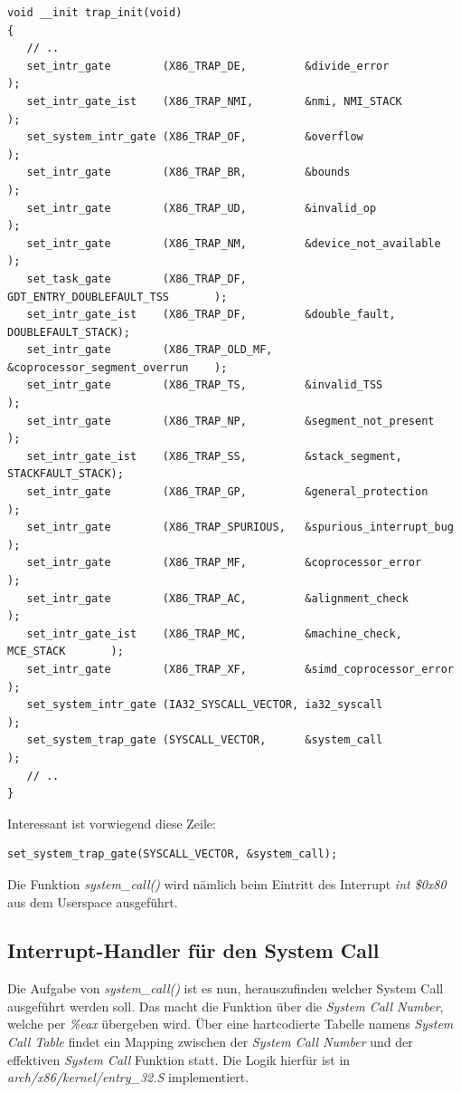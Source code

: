 \begin{lstlisting}[label=idt,caption=arch/x86/kernel/traps.c]
void __init trap_init(void)
{
   // ..
   set_intr_gate        (X86_TRAP_DE,         &divide_error                   );
   set_intr_gate_ist    (X86_TRAP_NMI,        &nmi, NMI_STACK                 );
   set_system_intr_gate (X86_TRAP_OF,         &overflow                       );
   set_intr_gate        (X86_TRAP_BR,         &bounds                         );
   set_intr_gate        (X86_TRAP_UD,         &invalid_op                     );
   set_intr_gate        (X86_TRAP_NM,         &device_not_available           );
   set_task_gate        (X86_TRAP_DF,         GDT_ENTRY_DOUBLEFAULT_TSS       );
   set_intr_gate_ist    (X86_TRAP_DF,         &double_fault, DOUBLEFAULT_STACK);
   set_intr_gate        (X86_TRAP_OLD_MF,     &coprocessor_segment_overrun    );
   set_intr_gate        (X86_TRAP_TS,         &invalid_TSS                    );
   set_intr_gate        (X86_TRAP_NP,         &segment_not_present            );
   set_intr_gate_ist    (X86_TRAP_SS,         &stack_segment, STACKFAULT_STACK);
   set_intr_gate        (X86_TRAP_GP,         &general_protection             );
   set_intr_gate        (X86_TRAP_SPURIOUS,   &spurious_interrupt_bug         );
   set_intr_gate        (X86_TRAP_MF,         &coprocessor_error              );
   set_intr_gate        (X86_TRAP_AC,         &alignment_check                );
   set_intr_gate_ist    (X86_TRAP_MC,         &machine_check, MCE_STACK       );
   set_intr_gate        (X86_TRAP_XF,         &simd_coprocessor_error         );
   set_system_intr_gate (IA32_SYSCALL_VECTOR, ia32_syscall                    );
   set_system_trap_gate (SYSCALL_VECTOR,      &system_call                    );
   // ..
}
\end{lstlisting}

Interessant ist vorwiegend diese Zeile:
\begin{lstlisting}
set_system_trap_gate(SYSCALL_VECTOR, &system_call);
\end{lstlisting}

Die Funktion \emph{system\_call()} wird nämlich beim Eintritt des Interrupt \emph{int \$0x80} aus dem Userspace ausgeführt.


\subsection{Interrupt-Handler für den System Call}

Die Aufgabe von \emph{system\_call()} ist es nun, herauszufinden welcher System Call ausgeführt werden soll. Das macht die Funktion über die \emph{System Call Number}, welche per \emph{\%eax}
übergeben wird. Über eine hartcodierte Tabelle namens \emph{System Call Table} findet ein Mapping zwischen der \emph{System Call Number} und der effektiven \emph{System Call} Funktion statt. 
Die Logik hierfür ist in \emph{arch/x86/kernel/entry\_32.S} implementiert. \\


